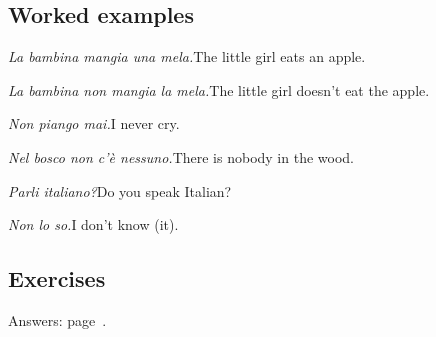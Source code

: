 \documentclass[11pt,a4paper,twoside,openright]{book}
\begin{document}
\subsection*{Worked examples}
\begin{examples}
\item\relax \textit{La bambina mangia una mela.}\newline The little girl eats an apple.
\item\relax \textit{La bambina non mangia la mela.}\newline The little girl doesn't eat the apple.
\item\relax \textit{Non piango mai.}\newline I never cry.
\item\relax \textit{Nel bosco non c'è nessuno.}\newline There is nobody in the wood.
\item\relax \textit{Parli italiano?}\newline Do you speak Italian?
\item\relax \textit{Non lo so.}\newline I don't know (it).
\end{examples}

\subsection*{Exercises}\label{les:word-order-negation-questions:exercises}
{\color{muted}\small Answers: page~\pageref{ans:word-order-negation-questions}.}
\end{document}
